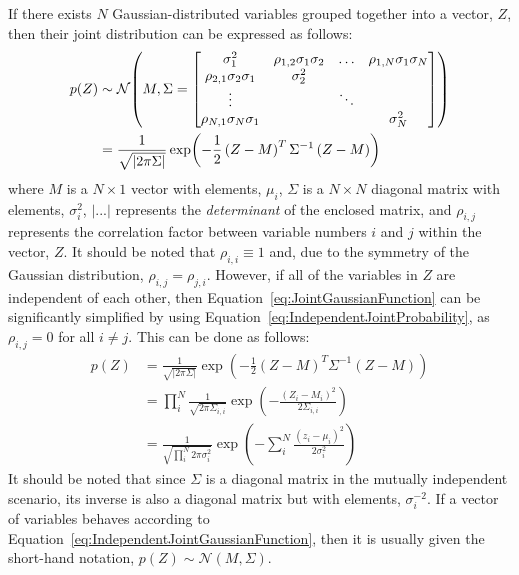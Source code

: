 \documentclass{article}
\begin{document}
If there exists $N$ Gaussian-distributed variables grouped together into a vector, $Z$, then their joint distribution can be expressed as follows:
\begin{equation}
\label{eq:JointGaussianFunction}
	\begin{aligned}
	p\!\left(Z\right) &\sim \mathcal{N}\!\left(M,\Sigma =
	\begin{bmatrix}
	\sigma_1^2 & \rho_{1,2} \sigma_1 \sigma_2 & \hdotsfor{1} & \rho_{1,N} \sigma_1 \sigma_N \\
	\rho_{2,1} \sigma_2 \sigma_1 & \sigma_2^2 & & \\
	\vdots & & \ddots & \\
	\rho_{N,1} \sigma_N \sigma_1 & & & \sigma_N^2
	\end{bmatrix}
	\right) \\
	&= \frac{1}{\sqrt{\left|2 \pi \Sigma\right|}} \exp\!\left(-\frac{1}{2} \left(Z - M\right)^T \Sigma^{-1} \left(Z - M\right)\right)
	\end{aligned}
\end{equation}
where $M$ is a $N \times 1$ vector with elements, $\mu_i$, $\Sigma$ is a $N \times N$ diagonal matrix with elements, $\sigma_i^2$, $\left|...\right|$ represents the \emph{determinant} of the enclosed matrix, and $\rho_{i,j}$ represents the correlation factor between variable numbers $i$ and $j$ within the vector, $Z$. It should be noted that $\rho_{i,i} \equiv 1$ and, due to the symmetry of the Gaussian distribution, $\rho_{i,j} = \rho_{j,i}$. However, if all of the variables in $Z$ are independent of each other, then Equation~\eqref{eq:JointGaussianFunction} can be significantly simplified by using Equation~\eqref{eq:IndependentJointProbability}, as $\rho_{i,j}=0$ for all $i \ne j$. This can be done as follows:
\begin{equation}
\label{eq:IndependentJointGaussianFunction}
	\begin{aligned}
	p\!\left(Z\right) &= \frac{1}{\sqrt{\left|2 \pi \Sigma\right|}} \exp\!\left(-\frac{1}{2} \left(Z - M\right)^T \Sigma^{-1} \left(Z - M\right)\right) \\
	&= \prod_{i}^{N} \frac{1}{\sqrt{2 \pi \Sigma_{i,i}}} \exp\!\left(-\frac{\left(Z_i - M_i\right)^2}{2 \Sigma_{i,i}}\right) \\
	&= \frac{1}{\sqrt{\prod_{i}^{N} 2 \pi \sigma_i^2}} \exp\!\left(-\sum_{i}^{N} \frac{\left(z_i - \mu_i\right)^2}{2 \sigma_i^2}\right)
	\end{aligned}
\end{equation}
It should be noted that since $\Sigma$ is a diagonal matrix in the mutually independent scenario, its inverse is also a diagonal matrix but with elements, $\sigma_i^{-2}$. If a vector of variables behaves according to Equation~\eqref{eq:IndependentJointGaussianFunction}, then it is usually given the short-hand notation, $p\!\left(Z\right) \sim \mathcal{N}\!\left(M,\Sigma\right)$.
\end{document}
